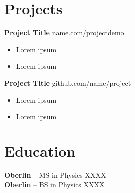 \documentclass[11pt,letterpaper]{article}
\begin{document}
\vspace{-18.5pt}

\section*{Projects}
\textbf{Project Title} \hfill name.com/projectdemo \\
\vspace{-10pt}
\begin{itemize}
  \item Lorem ipsum
  \item Lorem ipsum
\end{itemize}

\textbf{Project Title} \hfill github.com/name/project \\
\vspace{-10pt}
\begin{itemize}
  \item Lorem ipsum
  \item Lorem ipsum
\end{itemize}


\vspace{-18.5pt}

\section*{Education}
\textbf{Oberlin} -- MS in Physics \hfill XXXX \\
\textbf{Oberlin} -- BS in Physics \hfill XXXX
\end{document}
